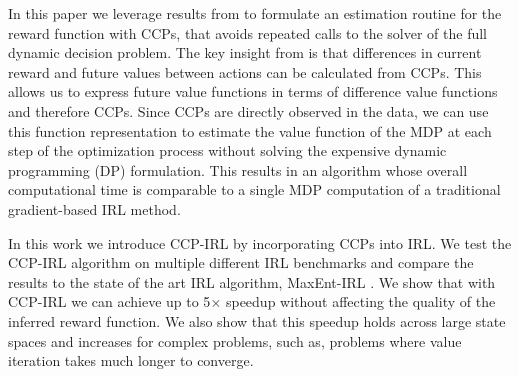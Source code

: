 \documentclass{article}
\begin{document}
In this paper we leverage results from \cite{rust_gmc, hotz, magnac} to formulate an estimation routine for the reward function with CCPs, that
avoids repeated calls to the solver of the full dynamic decision problem.
The key insight from \cite{hotz} is that differences in current reward and future values between actions can be calculated from CCPs. This allows us to express future value functions in terms of difference value functions and therefore CCPs.
Since CCPs are directly observed in the data, we can use this function representation to estimate the value function of the MDP at each step of the optimization process without solving the expensive dynamic programming (DP) formulation.
This results in an algorithm whose overall computational time is comparable to a single MDP computation of a traditional gradient-based IRL method. 

In this work we introduce CCP-IRL by incorporating CCPs into IRL. We test the CCP-IRL algorithm on multiple different IRL benchmarks and compare the results to the state of the art IRL algorithm, MaxEnt-IRL \cite{ziebart}. We show that with CCP-IRL we can achieve up to 5$\times$ speedup without affecting the quality of the inferred reward function. We also show that this speedup holds across large state spaces and increases for complex problems, such as, problems where value iteration takes much longer to converge. 




\end{document}

